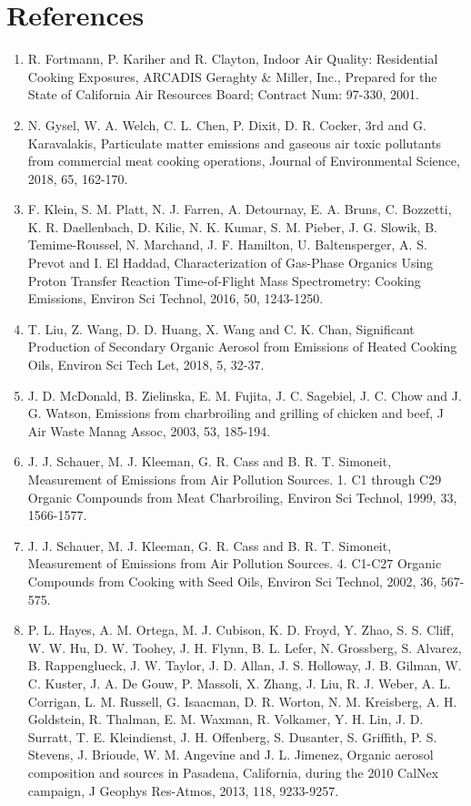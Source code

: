 \documentclass[
  11pt,
  oneside]{book}
\providecommand{\tightlist}{%
  \setlength{\itemsep}{0pt}\setlength{\parskip}{0pt}}
\begin{document}
\section{References}\label{cooking-references}

\begin{enumerate}
\def\labelenumi{\arabic{enumi}.}
\tightlist
\item
  R. Fortmann, P. Kariher and R. Clayton, Indoor Air Quality: Residential Cooking Exposures, ARCADIS Geraghty \& Miller, Inc., Prepared for the State of California Air Resources Board; Contract Num: 97-330, 2001.
\item
  N. Gysel, W. A. Welch, C. L. Chen, P. Dixit, D. R. Cocker, 3rd and G. Karavalakis, Particulate matter emissions and gaseous air toxic pollutants from commercial meat cooking operations, Journal of Environmental Science, 2018, 65, 162-170.
\item
  F. Klein, S. M. Platt, N. J. Farren, A. Detournay, E. A. Bruns, C. Bozzetti, K. R. Daellenbach, D. Kilic, N. K. Kumar, S. M. Pieber, J. G. Slowik, B. Temime-Roussel, N. Marchand, J. F. Hamilton, U. Baltensperger, A. S. Prevot and I. El Haddad, Characterization of Gas-Phase Organics Using Proton Transfer Reaction Time-of-Flight Mass Spectrometry: Cooking Emissions, Environ Sci Technol, 2016, 50, 1243-1250.
\item
  T. Liu, Z. Wang, D. D. Huang, X. Wang and C. K. Chan, Significant Production of Secondary Organic Aerosol from Emissions of Heated Cooking Oils, Environ Sci Tech Let, 2018, 5, 32-37.
\item
  J. D. McDonald, B. Zielinska, E. M. Fujita, J. C. Sagebiel, J. C. Chow and J. G. Watson, Emissions from charbroiling and grilling of chicken and beef, J Air Waste Manag Assoc, 2003, 53, 185-194.
\item
  J. J. Schauer, M. J. Kleeman, G. R. Cass and B. R. T. Simoneit, Measurement of Emissions from Air Pollution Sources. 1. C1 through C29 Organic Compounds from Meat Charbroiling, Environ Sci Technol, 1999, 33, 1566-1577.
\item
  J. J. Schauer, M. J. Kleeman, G. R. Cass and B. R. T. Simoneit, Measurement of Emissions from Air Pollution Sources. 4. C1-C27 Organic Compounds from Cooking with Seed Oils, Environ Sci Technol, 2002, 36, 567-575.
\item
  P. L. Hayes, A. M. Ortega, M. J. Cubison, K. D. Froyd, Y. Zhao, S. S. Cliff, W. W. Hu, D. W. Toohey, J. H. Flynn, B. L. Lefer, N. Grossberg, S. Alvarez, B. Rappenglueck, J. W. Taylor, J. D. Allan, J. S. Holloway, J. B. Gilman, W. C. Kuster, J. A. De Gouw, P. Massoli, X. Zhang, J. Liu, R. J. Weber, A. L. Corrigan, L. M. Russell, G. Isaacman, D. R. Worton, N. M. Kreisberg, A. H. Goldstein, R. Thalman, E. M. Waxman, R. Volkamer, Y. H. Lin, J. D. Surratt, T. E. Kleindienst, J. H. Offenberg, S. Dusanter, S. Griffith, P. S. Stevens, J. Brioude, W. M. Angevine and J. L. Jimenez, Organic aerosol composition and sources in Pasadena, California, during the 2010 CalNex campaign, J Geophys Res-Atmos, 2013, 118, 9233-9257.

\end{enumerate}
\end{document}
